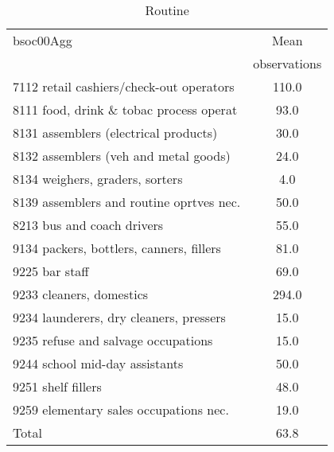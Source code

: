 \begin{table}
	\centering
	\caption{Routine}
	\begin{tabular}{lc}
	\toprule	
		
bsoc00Agg&Mean \\
&observations \\
\hline
7112 retail cashiers/check-out operators&110.0 \\
8111 food, drink \& tobac process operat&93.0 \\
8131 assemblers (electrical products)&30.0 \\
8132 assemblers (veh and metal goods)&24.0 \\
8134 weighers, graders, sorters&4.0 \\
8139 assemblers and routine oprtves nec.&50.0 \\
8213 bus and coach drivers&55.0 \\
9134 packers, bottlers, canners, fillers&81.0 \\
9225 bar staff&69.0 \\
9233 cleaners, domestics&294.0 \\
9234 launderers, dry cleaners, pressers&15.0 \\
9235 refuse and salvage occupations&15.0 \\
9244 school mid-day assistants&50.0 \\
9251 shelf fillers&48.0 \\
9259 elementary sales occupations nec.&19.0 \\
Total&63.8 \\
\bottomrule
\bottomrule
\end{tabular}
\end{table}
